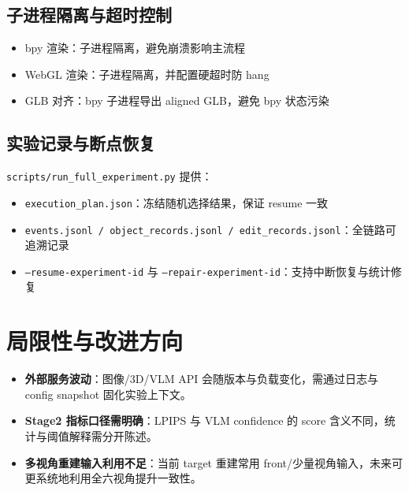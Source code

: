 \documentclass[UTF8,a4paper,11pt]{ctexart}
\begin{document}
\subsection{子进程隔离与超时控制}
\begin{itemize}
  \item bpy 渲染：子进程隔离，避免崩溃影响主流程
  \item WebGL 渲染：子进程隔离，并配置硬超时防 hang
  \item GLB 对齐：bpy 子进程导出 aligned GLB，避免 bpy 状态污染
\end{itemize}

\subsection{实验记录与断点恢复}
\texttt{scripts/run\_full\_experiment.py} 提供：
\begin{itemize}
  \item \texttt{execution\_plan.json}：冻结随机选择结果，保证 resume 一致
  \item \texttt{events.jsonl / object\_records.jsonl / edit\_records.jsonl}：全链路可追溯记录
  \item \texttt{--resume-experiment-id} 与 \texttt{--repair-experiment-id}：支持中断恢复与统计修复
\end{itemize}

\section{局限性与改进方向}
\begin{itemize}
  \item \textbf{外部服务波动}：图像/3D/VLM API 会随版本与负载变化，需通过日志与 config snapshot 固化实验上下文。
  \item \textbf{Stage2 指标口径需明确}：LPIPS 与 VLM confidence 的 score 含义不同，统计与阈值解释需分开陈述。
  \item \textbf{多视角重建输入利用不足}：当前 target 重建常用 front/少量视角输入，未来可更系统地利用全六视角提升一致性。
\end{itemize}
\end{document}
